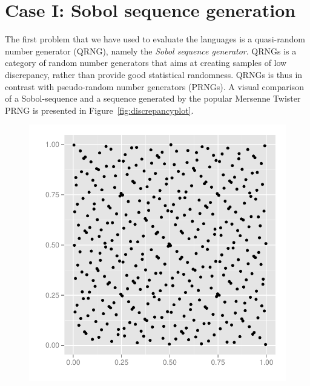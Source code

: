 \documentclass[preprint]{sigplanconf}
\begin{document}
\section{Case I: Sobol sequence generation}
\label{sec:sobol}
The first problem that we have used to evaluate the languages is a
quasi-random number generator (QRNG), namely the \emph{Sobol sequence
  generator}. QRNGs is a category of random number generators that
aims at creating samples of low discrepancy, rather than provide good
statistical randomness. QRNGs is thus in contrast with pseudo-random
number generators (PRNGs). A visual comparison of a Sobol-sequence and
a sequence generated by the popular Mersenne Twister PRNG is presented
in Figure~\ref{fig:discrepancyplot}.
\begin{figure}
  \centering
  \begin{minipage}{0.45\linewidth}
    \begin{center}
      \includegraphics[width=\textwidth]{../report/graphics/2D-sobol-sequence.pdf}


\end{center}
\end{minipage}
\end{figure}
\end{document}
